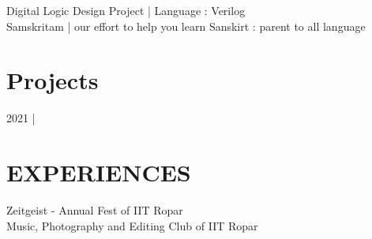 \documentclass[letterpaper]{deedy-resume}
\begin{document}
\begin{minipage}[t]{0.66\textwidth}

\textbullet{}Digital Logic Design Project | Language : Verilog\\
\textbullet{}Samskritam | our effort to help you learn Sanskirt : parent to all language


\sectionspace 

\section{Projects}
2021 | 


\section{EXPERIENCES} 

\textbullet{}
{\footnotesize Zeitgeist - Annual Fest of IIT Ropar\\}
\textbullet{}
{\footnotesize Music, Photography and Editing Club of IIT Ropar }
\sectionspace 

\end{minipage}
\end{document}
